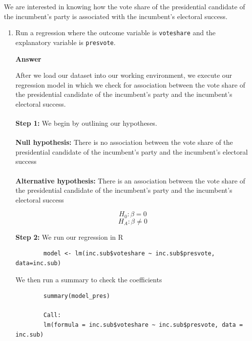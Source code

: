 \documentclass[12pt,letterpaper]{article}
\begin{document}
\noindent We are interested in knowing how the vote share of the presidential candidate of the incumbent's party is associated with the incumbent's electoral success.
	\vspace{.25cm}
	\begin{enumerate}
		\item Run a regression where the outcome variable is \texttt{voteshare} and the explanatory variable is \texttt{presvote}. \\
	
\noindent 

	\textbf{Answer}
	
	After we load our dataset into our working environment, we execute our regression
	model in which we check for association between the vote share of the presidential candidate of the incumbent's party and the incumbent's electoral success. \\
	\\
	
	\textbf{Step 1:} We begin by outlining our hypotheses. \\
	\\
	
	\textbf{Null hypothesis: }
	There is no association between the vote share of the presidential candidate of the incumbent’s party and the incumbent’s electoral success \\
	\\
	
	\textbf{Alternative hypothesis: }
	There is an association between the vote share of the presidential candidate of the incumbent’s party and the incumbent’s electoral success
	
	$$H_0: \beta = 0$$
	$$H_A: \beta \neq 0$$
	
	\vspace{.25cm}
	
	
	\textbf{Step 2:} We run our regression in R

	
	\begin{verbatim}
		model <- lm(inc.sub$voteshare ~ inc.sub$presvote, data=inc.sub)		
	\end{verbatim}
	
	We then run a summary to check the coefficients
	
	\begin{verbatim}
		summary(model_pres)
		
		Call:
		lm(formula = inc.sub$voteshare ~ inc.sub$presvote, data = inc.sub)
		

\end{verbatim}
\end{enumerate}
\end{document}
